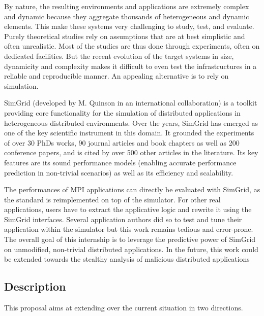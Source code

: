 \documentclass[a4paper,11pt]{article}
\begin{document}
By nature, the resulting environments and applications are extremely
complex and dynamic because they aggregate thousands of heterogeneous
and dynamic elements. This make these systems very challenging to
study, test, and evaluate.  Purely theoretical studies rely on
assumptions that are at best simplistic and often unrealistic. Most of
the studies are thus done through experiments, often on dedicated
facilities.
%
But the recent evolution of the target systems in size, dynamicity and
complexity makes it difficult to even test the infrastructures in a
reliable and reproducible manner. An appealing alternative is to rely
on simulation.


SimGrid (developed by M. Quinson in an international collaboration) is
a toolkit providing core functionality for the simulation of
distributed applications in heterogeneous distributed environments.
Over the years, SimGrid has emerged as one of the key scientific
instrument in this domain. It grounded the experiments of over 30 PhDs
works, 90 journal articles and book chapters as well as 200 conference
papers, and is cited by over 500 other articles in the literature. Its
key features are its sound performance models (enabling accurate
performance prediction in non-trivial scenarios) as well as its
efficiency and scalability.

The performances of MPI applications can directly be evaluated with
SimGrid, as the standard is reimplemented on top of the simulator. For
other real applications, users have to extract the applicative logic
and rewrite it using the SimGrid interfaces. Several application
authors did so to test and tune their application within the simulator
but this work remains tedious and error-prone. The overall goal of
this internship is to leverage the predictive power of SimGrid on
unmodified, non-trivial distributed applications. In the future, this
work could be extended towards the stealthy analysis of malicious
distributed applications

\subsection*{Description}
This proposal aims at extending over the current situation in two
directions. 
\end{document}
